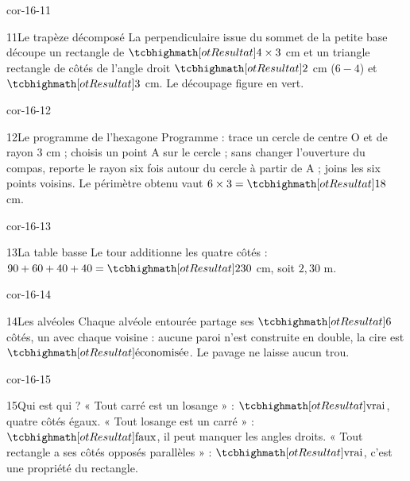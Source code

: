\begin{blocLivre}{cor-16-11}\begin{corrige}{11}{Le trapèze décomposé}
La perpendiculaire issue du sommet de la petite base découpe un rectangle de $\res{4\times3}$ cm et un triangle rectangle de côtés de l’angle droit $\res{2}$ cm ($6-4$) et $\res3$ cm. Le découpage figure en vert.
\label{fig-cor-16-11}
\end{corrige}\end{blocLivre}
\begin{blocLivre}{cor-16-12}\begin{corrige}{12}{Le programme de l’hexagone}
Programme : trace un cercle de centre O et de rayon 3 cm ; choisis un point A sur le cercle ; sans changer l’ouverture du compas, reporte le rayon six fois autour du cercle à partir de A ; joins les six points voisins. Le périmètre obtenu vaut $6\times3=\res{18}$ cm.
\label{fig-cor-16-12}
\end{corrige}\end{blocLivre}
\begin{blocLivre}{cor-16-13}\begin{corrige}{13}{La table basse}
Le tour additionne les quatre côtés : $90+60+40+40=\res{230}$ cm, soit $2{,}30$ m.
\label{fig-cor-16-13}
\end{corrige}\end{blocLivre}
\begin{blocLivre}{cor-16-14}\begin{corrige}{14}{Les alvéoles}
Chaque alvéole entourée partage ses $\res6$ côtés, un avec chaque voisine : aucune paroi n’est construite en double, la cire est $\res{\text{économisée}}$. Le pavage ne laisse aucun trou.
\label{fig-cor-16-14}
\end{corrige}\end{blocLivre}
\begin{blocLivre}{cor-16-15}\begin{corrige}{15}{Qui est qui ?}
« Tout carré est un losange » : $\res{\text{vrai}}$, quatre côtés égaux. « Tout losange est un carré » : $\res{\text{faux}}$, il peut manquer les angles droits. « Tout rectangle a ses côtés opposés parallèles » : $\res{\text{vrai}}$, c’est une propriété du rectangle.
\label{fig-cor-16-15}
\end{corrige}\end{blocLivre}
